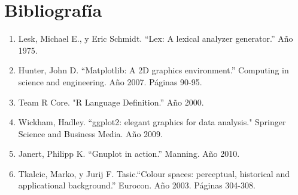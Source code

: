 \documentclass{article}
\begin{document}

\section{Bibliografía}

	\begin{enumerate}
		\item Lesk, Michael E., y Eric Schmidt. ``Lex: A lexical analyzer generator.'' Año 1975.
		\item Hunter, John D. ``Matplotlib: A 2D graphics environment.'' Computing in science and engineering. Año 2007. Páginas 90-95.
		\item Team R Core. "R Language Definition.'' Año 2000.
		\item Wickham, Hadley. ``ggplot2: elegant graphics for data analysis." Springer Science and Business Media. Año 2009.
		\item Janert, Philipp K. ``Gnuplot in action.'' Manning. Año 2010.
		\item Tkalcic, Marko, y Jurij F. Tasic.``Colour spaces: perceptual, historical and applicational background.'' Eurocon. Año 2003. Páginas 304-308.
	\end{enumerate}
\end{document}
